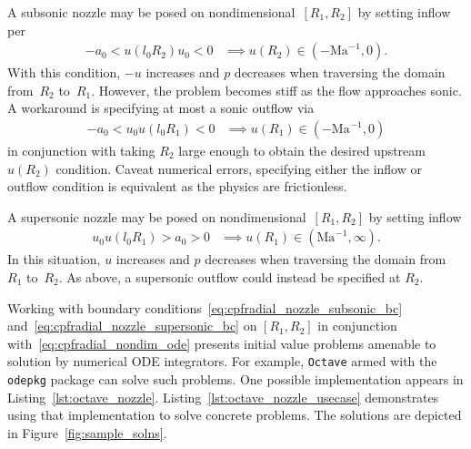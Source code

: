 \documentclass[letterpaper,11pt,nointlimits,reqno]{amsart}
\newcommand{\Mach}[1][]{\ensuremath{\mbox{Ma}_{#1}}}
\begin{document}
A subsonic nozzle may be posed on nondimensional~$\left[R_{1}, R_{2}\right]$ by
setting inflow per
\begin{align}
    -a_0 < u\!\left(l_0 R_{2}\right) u_0 < 0
    &\implies
    u\!\left(R_{2}\right) \in \left(-\Mach^{-1}, 0\right)
.
\end{align}
With this condition, $-u$ increases and $p$ decreases when traversing the
domain from~$R_{2}$ to~$R_{1}$.  However, the problem becomes stiff as the flow
approaches sonic.  A workaround is specifying at most a sonic outflow via
\begin{align}
    -a_0 < u_0 u\!\left(l_0 R_1\right) < 0
    &\implies
    u\!\left(R_1\right) \in \left(-\Mach^{-1}, 0\right)
\label{eq:cpfradial_nozzle_subsonic_bc}
\end{align}
in conjunction with taking $R_{2}$ large enough to obtain the desired upstream
$u\!\left(R_{2}\right)$ condition.  Caveat numerical errors, specifying either
the inflow or outflow condition is equivalent as the physics are frictionless.

A supersonic nozzle may be posed on nondimensional~$\left[R_{1}, R_{2}\right]$
by setting inflow
\begin{align}
    u_0 u\!\left(l_0 R_{1}\right) > a_0 > 0
    &\implies
    u\!\left(R_{1}\right) \in \left(\Mach^{-1}, \infty\right)
\label{eq:cpfradial_nozzle_supersonic_bc}
.
\end{align}
In this situation, $u$ increases and $p$ decreases when traversing the domain
from~$R_{1}$ to~$R_{2}$.  As above, a supersonic outflow could instead be
specified at $R_{2}$.

Working with boundary conditions~\eqref{eq:cpfradial_nozzle_subsonic_bc}
and~\eqref{eq:cpfradial_nozzle_supersonic_bc} on $\left[R_1, R_2\right]$ in
conjunction with~\eqref{eq:cpfradial_nondim_ode} presents initial value
problems amenable to solution by numerical ODE integrators.  For example,
\texttt{Octave}\citep{Eaton2008GNU} armed with the \texttt{odepkg} package can
solve such problems.
One possible implementation appears in Listing~\ref{lst:octave_nozzle}.
Listing~\ref{lst:octave_nozzle_usecase} demonstrates using that implementation
to solve concrete problems.  The solutions are depicted in
Figure~\ref{fig:sample_solns}.
\end{document}
